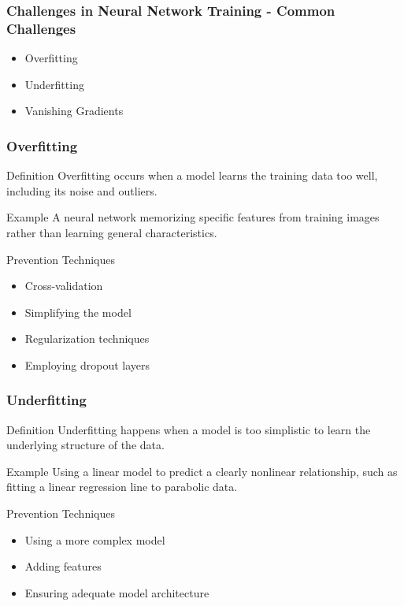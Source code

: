 \documentclass[aspectratio=169]{beamer}
\begin{document}
\begin{frame}[fragile]
    \frametitle{Challenges in Neural Network Training - Common Challenges}
    \begin{itemize}
        \item Overfitting
        \item Underfitting
        \item Vanishing Gradients
    \end{itemize}
\end{frame}

\begin{frame}[fragile]
    \frametitle{Overfitting}
    \begin{block}{Definition}
        Overfitting occurs when a model learns the training data too well, including its noise and outliers.
    \end{block}
    \begin{block}{Example}
        A neural network memorizing specific features from training images rather than learning general characteristics.
    \end{block}
    \begin{block}{Prevention Techniques}
        \begin{itemize}
            \item Cross-validation
            \item Simplifying the model
            \item Regularization techniques
            \item Employing dropout layers
        \end{itemize}
    \end{block}
\end{frame}

\begin{frame}[fragile]
    \frametitle{Underfitting}
    \begin{block}{Definition}
        Underfitting happens when a model is too simplistic to learn the underlying structure of the data.
    \end{block}
    \begin{block}{Example}
        Using a linear model to predict a clearly nonlinear relationship, such as fitting a linear regression line to parabolic data.
    \end{block}
    \begin{block}{Prevention Techniques}
        \begin{itemize}
            \item Using a more complex model
            \item Adding features
            \item Ensuring adequate model architecture
        \end{itemize}
    \end{block}
\end{frame}
\end{document}
